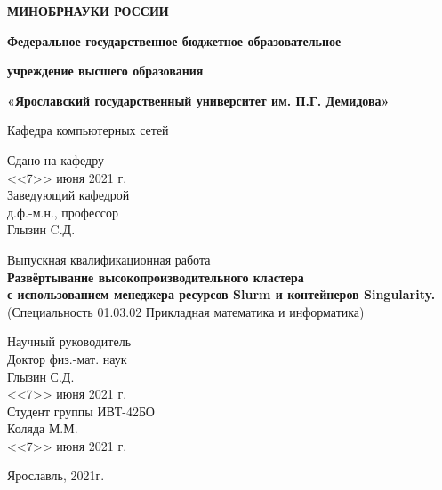 \documentclass[a4paper]{extarticle}
\begin{document}
%
%
%
\begin{titlepage}
\fontsize{14pt}{12pt}
\begin{center}
\large
\textbf{МИНОБРНАУКИ РОССИИ}
\vspace{0.5cm}
			
\textbf{Федеральное государственное бюджетное образовательное}
		
\textbf{учреждение высшего образования}
		
\textbf{«Ярославский государственный университет им. П.Г. Демидова»}
\vspace{0.25cm}
			
			
Кафедра компьютерных сетей
\vfill

\begin{flushright}
Сдано на кафедру\\
<<7>> июня 2021 г.\\ 
Заведующий кафедрой\\
д.ф.-м.н., профессор\\
\underline{\hspace{2cm}}Глызин C.Д.\\
\end{flushright}
			
Выпускная квалификационная работа \\
\textbf{Развёртывание высокопроизводительного кластера} \\
\textbf{с использованием менеджера ресурсов Slurm и контейнеров Singularity.} \\
(Специальность 01.03.02 Прикладная математика и информатика) 
\vfill
\bigskip
\end{center}
\begin{flushright}
Научный руководитель\\
Доктор физ.-мат. наук\\
Глызин С.Д. \underline{\hspace{2cm}}\\
<<7>> июня 2021 г.\\
Студент группы ИВТ-42БО\\
Коляда М.М. \underline{\hspace{2cm}}\\
 <<7>> июня 2021 г.\\
\end{flushright}
\begin{center}
Ярославль, 2021г.
\end{center}
\end{titlepage}

\pagestyle{empty}
\tableofcontents
\clearpage
\pagestyle{plain}
\end{document}

